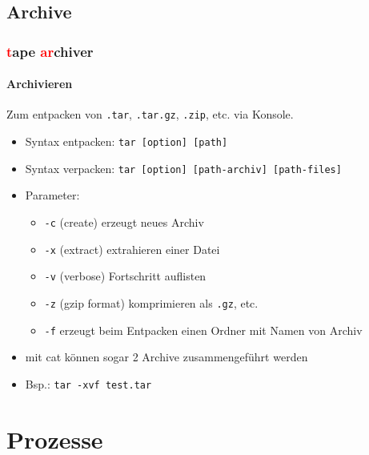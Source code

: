\documentclass[12pt,utf8]{beamer}
\begin{document}
\subsection{Archive}
\begin{frame}
\frametitle{\textcolor{red}{t}ape \textcolor{red}{ar}chiver}
\framesubtitle{\textcolor{ownDarkOr}{Archivieren}}
Zum entpacken von \texttt{.tar}, \texttt{.tar.gz}, \texttt{.zip}, etc. via Konsole.
\begin{itemize}
	\item Syntax entpacken: \texttt{tar [option] [path]}
	\item Syntax verpacken: \texttt{tar [option] [path-archiv] [path-files]}
	\item Parameter:
	\begin{itemize}[<+->]
		\item {\scriptsize \texttt{-c} (create) erzeugt neues Archiv}
		\item {\scriptsize \texttt{-x} (extract) extrahieren einer Datei}
		\item {\scriptsize \texttt{-v} (verbose) Fortschritt auflisten}
		\item {\scriptsize \texttt{-z} (gzip format) komprimieren als \texttt{.gz}, etc.}
		\item {\scriptsize \texttt{-f} erzeugt beim Entpacken einen Ordner mit Namen von Archiv}
	\end{itemize}
	\item {\scriptsize mit cat können sogar 2 Archive zusammengeführt werden}
	\item Bsp.: \texttt{tar -xvf test.tar}
\end{itemize}
\end{frame}

\section{Prozesse}
\end{document}
